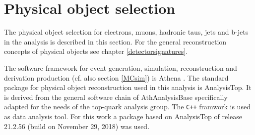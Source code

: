 \section{Physical object selection}\label{physObj}
The physical object selection for electrons, muons, hadronic taus, jets and b-jets in the analysis is described in this section. For the general reconstruction concepts of physical objects see chapter \ref{detectorsignatures}.\par
The {\ATLAS} software framework for event generation, simulation, reconstruction and derivation production (cf. also section \ref{MCsim}) is Athena \cite{Athena}. %
The standard package for physical object reconstruction used in this analysis is AnalysisTop. It is derived from the general software chain of AthAnalysisBase specifically adapted for the needs of the top-quark analysis group. The \texttt{C++} framwork {\ROOT} is used as data analysis tool. For this work a package based on AnalysisTop of release 21.2.56 (build on November 29, 2018) was used.\par
